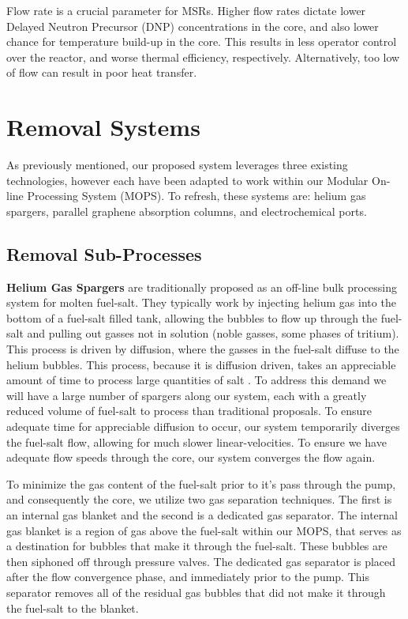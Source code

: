 \documentclass{anstrans}
\begin{document}
Flow rate is a crucial parameter for MSRs. Higher flow rates dictate lower Delayed Neutron Precursor (DNP) concentrations in the core, and also lower chance for temperature build-up in the core. This results in less operator control over the reactor, and worse thermal efficiency, respectively. Alternatively, too low of flow can result in poor heat transfer. 


\section{Removal Systems}\label{remsys}
As previously mentioned, our proposed system leverages three existing technologies, however each have been adapted to work within our Modular On-line Processing System (MOPS). To refresh, these systems are: helium gas spargers, parallel graphene absorption columns, and electrochemical ports.

\subsection{Removal Sub-Processes}
\textbf{Helium Gas Spargers} are traditionally proposed as an off-line bulk processing system for molten fuel-salt. They typically work by injecting helium gas into the bottom of a fuel-salt filled tank, allowing the bubbles to flow up through the fuel-salt and pulling out gasses not in solution (noble gasses, some phases of tritium). This process is driven by diffusion, where the gasses in the fuel-salt diffuse to the helium bubbles. This process, because it is diffusion driven, takes an appreciable amount of time to process large quantities of salt \cite{XeRemoval}. To address this demand we will have a large number of spargers along our system, each with a greatly reduced volume of fuel-salt to process than traditional proposals. To ensure adequate time for appreciable diffusion to occur, our system temporarily diverges the fuel-salt flow, allowing for much slower linear-velocities. To ensure we have adequate flow speeds through the core, our system converges the flow again. 

To minimize the gas content of the fuel-salt prior to it's pass through the pump, and consequently the core, we utilize two gas separation techniques. The first is an internal gas blanket and the second is a dedicated gas separator. The internal gas blanket is a region of gas above the fuel-salt within our MOPS, that serves as a destination for bubbles that make it through the fuel-salt. These bubbles are then siphoned off through pressure valves. The dedicated gas separator is placed after the flow convergence phase, and immediately prior to the pump. This separator removes all of the residual gas bubbles that did not make it through the fuel-salt to the blanket.\newline
\end{document}
